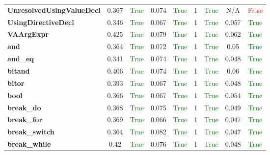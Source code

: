 \documentclass{article}
\begin{document}
\begin{xltabular}{\textwidth}{lcccccccc}
\textbf{{\fontsize{10}{12}\selectfont UnresolvedUsingValueDecl}}& 0.367&\textcolor{green}{True}& 0.074&\textcolor{green}{True}& 1&\textcolor{green}{True}& N/A&\textcolor{red}{False} \\[0.5ex]
\textbf{{\fontsize{10}{12}\selectfont UsingDirectiveDecl}}& 0.346&\textcolor{green}{True}& 0.067&\textcolor{green}{True}& 1&\textcolor{green}{True}& 0.057&\textcolor{green}{True} \\[0.5ex]
\textbf{{\fontsize{10}{12}\selectfont VAArgExpr}}& 0.425&\textcolor{green}{True}& 0.079&\textcolor{green}{True}& 1&\textcolor{green}{True}& 0.062&\textcolor{green}{True} \\[0.5ex]
\textbf{{\fontsize{10}{12}\selectfont and}}& 0.364&\textcolor{green}{True}& 0.072&\textcolor{green}{True}& 1&\textcolor{green}{True}& 0.05&\textcolor{green}{True} \\[0.5ex]
\textbf{{\fontsize{10}{12}\selectfont and\_eq}}& 0.341&\textcolor{green}{True}& 0.074&\textcolor{green}{True}& 1&\textcolor{green}{True}& 0.048&\textcolor{green}{True} \\[0.5ex]
\textbf{{\fontsize{10}{12}\selectfont bitand}}& 0.406&\textcolor{green}{True}& 0.074&\textcolor{green}{True}& 1&\textcolor{green}{True}& 0.06&\textcolor{green}{True} \\[0.5ex]
\textbf{{\fontsize{10}{12}\selectfont bitor}}& 0.393&\textcolor{green}{True}& 0.067&\textcolor{green}{True}& 1&\textcolor{green}{True}& 0.048&\textcolor{green}{True} \\[0.5ex]
\textbf{{\fontsize{10}{12}\selectfont bool}}& 0.366&\textcolor{green}{True}& 0.067&\textcolor{green}{True}& 1&\textcolor{green}{True}& 0.054&\textcolor{green}{True} \\[0.5ex]
\textbf{{\fontsize{10}{12}\selectfont break\_do}}& 0.368&\textcolor{green}{True}& 0.075&\textcolor{green}{True}& 1&\textcolor{green}{True}& 0.049&\textcolor{green}{True} \\[0.5ex]
\textbf{{\fontsize{10}{12}\selectfont break\_for}}& 0.369&\textcolor{green}{True}& 0.066&\textcolor{green}{True}& 1&\textcolor{green}{True}& 0.047&\textcolor{green}{True} \\[0.5ex]
\textbf{{\fontsize{10}{12}\selectfont break\_switch}}& 0.364&\textcolor{green}{True}& 0.082&\textcolor{green}{True}& 1&\textcolor{green}{True}& 0.047&\textcolor{green}{True} \\[0.5ex]
\textbf{{\fontsize{10}{12}\selectfont break\_while}}& 0.42&\textcolor{green}{True}& 0.076&\textcolor{green}{True}& 1&\textcolor{green}{True}& 0.048&\textcolor{green}{True} \\[0.5ex]

\end{xltabular}
\end{document}
